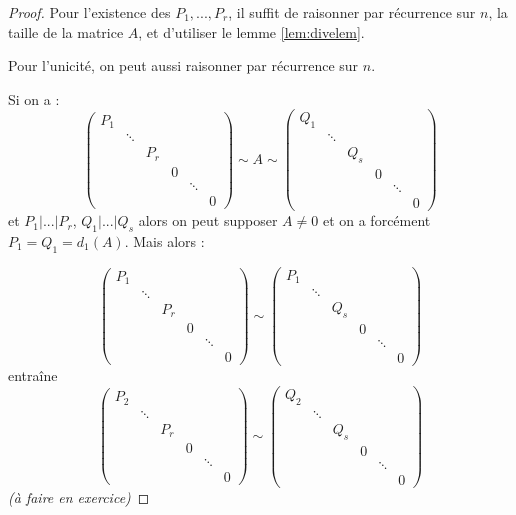 \documentclass[class=report,crop=false]{standalone}
\newcommand{\exoo}{\emph{(à faire en exercice)}}
\begin{document}
\begin{proof}
Pour l'existence des $P_1,...,P_r$, il suffit de raisonner par récurrence sur $n$, la taille de la matrice $A$, et d'utiliser le lemme \ref{lem:divelem}.

Pour l'unicité, on peut aussi raisonner par récurrence sur $n$.

Si on a :
\[\left(\begin{array}{cccccc}
P_1 &&&&&\\
& \ddots&&&&\\
&&P_r&&&\\
&&&0&&\\
&&&&\ddots&\\
&&&&&0
\end{array}
\right) \sim A \sim \left(\begin{array}{cccccc}
Q_1 &&&&&\\
& \ddots&&&&\\
&&Q_s&&&\\
&&&0&&\\
&&&&\ddots&\\
&&&&&0
\end{array}
\right)\]
et $P_1|...|P_r$, $Q_1|...|Q_s$
alors on peut supposer $A \neq 0$ et on a forcément $P_1 = Q_1 = d_1(A)$. Mais alors :
 
\[\left(\begin{array}{cccccc}
P_1 &&&&&\\
& \ddots&&&&\\
&&P_r&&&\\
&&&0&&\\
&&&&\ddots&\\
&&&&&0
\end{array}
\right)  \sim \left(\begin{array}{cccccc}
P_1 &&&&&\\
& \ddots&&&&\\
&&Q_s&&&\\
&&&0&&\\
&&&&\ddots&\\
&&&&&0
\end{array}
\right)\]
entra\^ine 
\[\left(\begin{array}{cccccc}
P_2 &&&&&\\
& \ddots&&&&\\
&&P_r&&&\\
&&&0&&\\
&&&&\ddots&\\
&&&&&0
\end{array}
\right)  \sim \left(\begin{array}{cccccc}
Q_2 &&&&&\\
& \ddots&&&&\\
&&Q_s&&&\\
&&&0&&\\
&&&&\ddots&\\
&&&&&0
\end{array}
\right)\]
\exoo
\end{proof}
\end{document}
